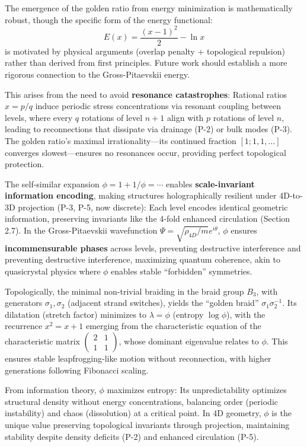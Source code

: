The emergence of the golden ratio from energy minimization is mathematically robust, though the specific form of the energy functional:
\[
E(x) = \frac{(x-1)^2}{2} - \ln x
\]
is motivated by physical arguments (overlap penalty + topological repulsion) rather than derived from first principles. Future work should establish a more rigorous connection to the Gross-Pitaevskii energy.

This arises from the need to avoid \textbf{resonance catastrophes}: Rational ratios $x = p/q$ induce periodic stress concentrations via resonant coupling between levels, where every $q$ rotations of level $n+1$ align with $p$ rotations of level $n$, leading to reconnections that dissipate via drainage (P-2) or bulk modes (P-3). The golden ratio's maximal irrationality---its continued fraction $[1; 1, 1, \ldots]$ converges slowest---ensures no resonances occur, providing perfect topological protection.

The self-similar expansion $\phi = 1 + 1/\phi = \cdots$ enables \textbf{scale-invariant information encoding}, making structures holographically resilient under 4D-to-3D projection (P-3, P-5, now discrete): Each level encodes identical geometric information, preserving invariants like the 4-fold enhanced circulation (Section 2.7). In the Gross-Pitaevskii wavefunction $\Psi = \sqrt{\rho_{4D}/m} e^{i \theta}$, $\phi$ ensures \textbf{incommensurable phases} across levels, preventing destructive interference and preventing destructive interference, maximizing quantum coherence, akin to quasicrystal physics where $\phi$ enables stable ``forbidden'' symmetries.

Topologically, the minimal non-trivial braiding in the braid group $B_3$, with generators $\sigma_1, \sigma_2$ (adjacent strand switches), yields the ``golden braid'' $\sigma_1 \sigma_2^{-1}$. Its dilatation (stretch factor) minimizes to $\lambda = \phi$ (entropy $\log \phi$), with the recurrence $x^2 = x + 1$ emerging from the characteristic equation of the characteristic matrix $\begin{pmatrix} 2 & 1 \\ 1 & 1 \end{pmatrix}$, whose dominant eigenvalue relates to $\phi$. This ensures stable leapfrogging-like motion without reconnection, with higher generations following Fibonacci scaling.

From information theory, $\phi$ maximizes entropy: Its unpredictability optimizes structural density without energy concentrations, balancing order (periodic instability) and chaos (dissolution) at a critical point. In 4D geometry, $\phi$ is the unique value preserving topological invariants through projection, maintaining stability despite density deficits (P-2) and enhanced circulation (P-5).

